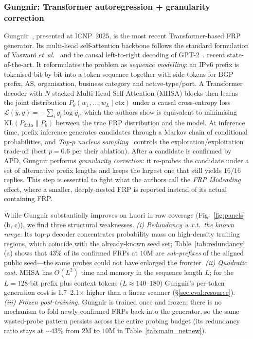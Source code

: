 \documentclass[conference]{IEEEtran}
\begin{document}
\subsubsection{Gungnir: Transformer autoregression + granularity correction}
\label{sec:bg:gungnir}
Gungnir~\cite{wei2025gungnir}, presented at ICNP~2025, is the most
recent Transformer-based FRP generator.  Its multi-head
self-attention backbone follows the standard formulation of
Vaswani \emph{et~al.}~\cite{vaswani2017attention} and the causal
left-to-right decoding of GPT-2~\cite{radford2019gpt2}.
recent state-of-the-art.  It reformulates the problem as
\emph{sequence modelling}: an IPv6 prefix is tokenised bit-by-bit
into a token sequence together with side tokens for BGP prefix,
AS, organisation, business category and active-type/port.  A
Transformer decoder with $N$ stacked
Multi-Head-Self-Attention (MHSA) blocks then learns the joint
distribution $P_\theta(w_1,\ldots,w_L\mid\text{ctx})$ under a
causal cross-entropy loss
    $\mathcal{L}(\hat{y},y) = -\sum_i y_i\log\hat{y}_i$,
which the authors show is equivalent to minimising
$\mathrm{KL}\!\left(P_{\text{data}}\!\parallel\!P_\theta\right)$
between the true FRP distribution and the model.  At inference
time, prefix inference generates candidates through a Markov
chain of conditional probabilities, and \emph{Top-$p$ nucleus
sampling}~\cite{holtzman2020top-p} controls the
exploration/exploitation trade-off (best $p=0.6$ per their
ablation).  After a candidate is confirmed by APD, Gungnir
performs \emph{granularity correction}: it re-probes the
candidate under a set of alternative prefix lengths and keeps
the largest one that still yields $16/16$ replies.
This step is essential to fight what the authors call the
\emph{FRP Misleading} effect, where a smaller, deeply-nested
FRP is reported instead of its actual containing FRP.

While Gungnir substantially improves on Luori in raw coverage
(Fig.~\ref{fig:panels}(b, c)), we find three structural weaknesses.
\emph{(i) Redundancy w.r.t.\ the known range.}  Its top-$p$ decoder
concentrates probability mass on high-density training regions,
which coincide with the already-known seed set;
Table~\ref{tab:redundancy}(a) shows that $43\%$ of its confirmed
FRPs at $10$M are \emph{sub-prefixes} of the aligned public
seed---the same probes could not have enlarged the frontier.
\emph{(ii) Quadratic cost.}  MHSA has $O(L^2)$ time and memory
in the sequence length $L$; for the $L=128$-bit prefix plus
context tokens ($L\!\approx\!140$--$180$) Gungnir's per-token
generation cost is 1.7--2.1$\times$ higher than a linear
scanner (\S\ref{sec:eval:resource}).
\emph{(iii) Frozen post-training.}  Gungnir is trained once and
frozen; there is no mechanism to fold newly-confirmed FRPs back
into the generator, so the same wasted-probe pattern persists
across the entire probing budget (its redundancy ratio stays at
$\sim\!43\%$ from $2$M to $10$M in Table~\ref{tab:main_netnew}).
\end{document}
